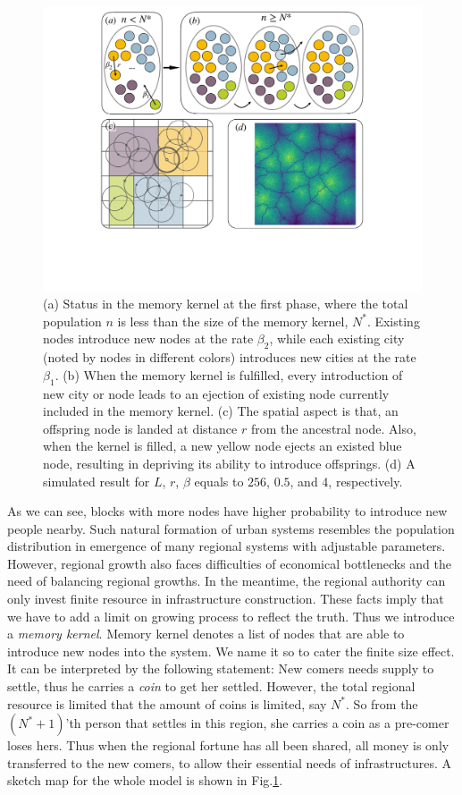\documentclass[reprint,unsortedaddress,amsmath,amssymb,aps,prl,showkeys]{revtex4-2}
\begin{document}
\begin{figure}
    \centering
    \includegraphics[width = 0.95\linewidth]{pics/sketchgood.pdf}
    \caption{(a) Status in the memory kernel at the first phase, where the total population $n$ is less than the size of the memory kernel, $N^*$. Existing nodes introduce new nodes at the rate $\beta_2$, while each existing city (noted by nodes in different colors) introduces new cities at the rate $\beta_1$. (b) When the memory kernel is fulfilled, every introduction of new city or node leads to an ejection of existing node currently included in the memory kernel. (c) The spatial aspect is that, an offspring node is landed at distance $r$ from the ancestral node. Also, when the kernel is filled, a new yellow node ejects an existed blue node, resulting in depriving its ability to introduce offsprings. (d) A simulated result for $L$, $r$, $\beta$ equals to $256$, $0.5$, and $4$, respectively.}
    \label{sketchpic}
\end{figure}

As we can see, blocks with more nodes have higher probability to introduce new people nearby. Such natural formation of urban systems resembles the population distribution in emergence of many regional systems with adjustable parameters. However, regional growth also faces difficulties of economical bottlenecks and the need of balancing regional growths. In the meantime, the regional authority can only invest finite resource in infrastructure construction. These facts imply that we have to add a limit on growing process to reflect the truth. Thus we introduce a \emph{memory kernel}. Memory kernel denotes a list of nodes that are able to introduce new nodes into the system. We name it so to cater the finite size effect. It can be interpreted by the following statement: New comers needs supply to settle, thus he carries a \emph{coin} to get her settled. However, the total regional resource is limited that the amount of coins is limited, say $N^*$. So from the $(N^*+1)$'th person that settles in this region, she carries a coin as a pre-comer loses hers. Thus when the regional fortune has all been shared, all money is only transferred to the new comers, to allow their essential needs of infrastructures. A sketch map for the whole model is shown in Fig.\@\ref{sketchpic}.
\end{document}
